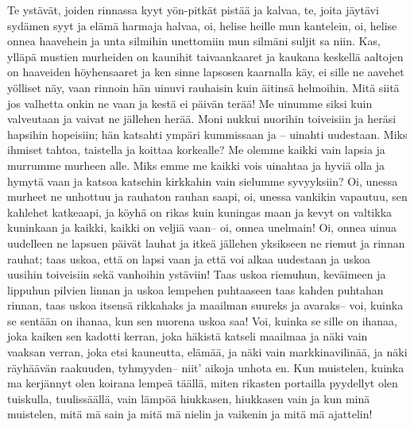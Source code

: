   \beginverse
    Te ystävät, joiden rinnassa kyyt
    yön-pitkät pistää ja kalvaa,
    te, joita jäytävi sydämen syyt
    ja elämä harmaja halvaa,
    oi, helise heille mun kantelein,
    oi, helise onnea haavehein
    ja unta silmihin unettomiin
    mun silmäni suljit sa niin.
    Kas, ylläpä mustien murheiden
    on kaunihit taivaankaaret
    ja kaukana keskellä aaltojen
    on haaveiden höyhensaaret
    ja ken sinne lapsosen kaarnalla käy,
    ei sille ne aavehet yölliset näy,
    vaan rinnoin hän uinuvi rauhaisin
    kuin äitinsä helmoihin.
  \endverse
  \beginverse
    Mitä siitä jos valhetta onkin ne vaan
    ja kestä ei päivän terää!
    Me uinumme siksi kuin valveutaan
    ja vaivat ne jällehen herää.
    Moni nukkui nuorihin toiveisiin
    ja heräsi hapsihin hopeisiin;
    hän katsahti ympäri kummissaan
    ja -- uinahti uudestaan.
    Miks ihmiset tahtoa, taistella
    ja koittaa korkealle?
    Me olemme kaikki vain lapsia
    ja murrumme murheen alle.
    Miks emme me kaikki vois uinahtaa
    ja hyviä olla ja hymytä vaan
    ja katsoa katsehin kirkkahin
    vain sielumme syvyyksiin?
  \endverse
  \beginverse
    Oi, unessa murheet ne unhottuu
    ja rauhaton rauhan saapi,
    oi, unessa vankikin vapautuu,
    sen kahlehet katkeaapi,
    ja köyhä on rikas kuin kuningas maan
    ja kevyt on valtikka kuninkaan
    ja kaikki, kaikki on veljiä vaan--
    oi, onnea unelmain!
  \endverse
  \beginverse
    Oi, onnea uinua uudelleen
    ne lapsuen päivät lauhat
    ja itkeä jällehen yksikseen
    ne riemut ja rinnan rauhat;
    taas uskoa, että on lapsi vaan
    ja että voi alkaa uudestaan
    ja uskoa uusihin toiveisiin
    sekä vanhoihin ystäviin!
  \endverse
  \beginverse
    Taas uskoa riemuhun, keväimeen
    ja lippuhun pilvien linnan
    ja uskoa lempehen puhtaaseen
    taas kahden puhtahan rinnan,
    taas uskoa itsensä rikkahaks
    ja maailman suureks ja avaraks--
    voi, kuinka se sentään on ihanaa,
    kun sen nuorena uskoa saa!
  \endverse
  \beginverse
    Voi, kuinka se sille on ihanaa,
    joka kaiken sen kadotti kerran,
    joka häkistä katseli maailmaa
    ja näki vain vaaksan verran,
    joka etsi kauneutta, elämää,
    ja näki vain markkinavilinää,
    ja näki räyhäävän raakuuden, tyhmyyden--
    niit' aikoja unhota en.
  \endverse
  \beginverse
    Kun muistelen, kuinka ma kerjännyt
    olen koirana lempeä täällä,
    miten rikasten portailla pyydellyt
    olen tuiskulla, tuulissäällä,
    vain lämpöä hiukkasen, hiukkasen vain
    ja kun minä muistelen, mitä mä sain
    ja mitä mä nielin ja vaikenin
    ja mitä mä ajattelin!
  \endverse
